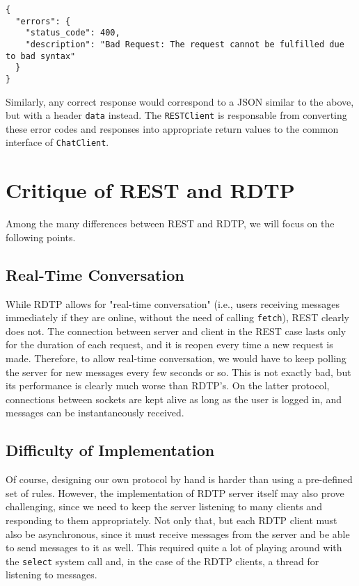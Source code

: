 \documentclass[10pt]{article}
\begin{document}
\medskip

\begin{verbatim}
{
  "errors": {
    "status_code": 400,
    "description": "Bad Request: The request cannot be fulfilled due to bad syntax"
  }
}
\end{verbatim}

\medskip

Similarly, any correct response would correspond to a JSON similar to the above,
but with a header \verb|data| instead. The \verb|RESTClient| is responsable from
converting these error codes and responses into appropriate return values to 
the common interface of \verb|ChatClient|.

\section{Critique of REST and RDTP}

Among the many differences between REST and RDTP, we will focus on the following points.

\subsection{Real-Time Conversation}

While RDTP allows for "real-time conversation" (i.e., users receiving messages immediately
if they are online, without the need of calling \verb|fetch|), REST clearly does not. The
connection between server and client in the REST case lasts only for the duration of each
request, and it is reopen every time a new request is made. Therefore, to allow real-time
conversation, we would have to keep polling the server for new messages every few seconds or so.
This is not exactly bad, but its performance is clearly much worse than RDTP's. On the latter
protocol, connections between sockets are kept alive as long as the user is logged in, and
messages can be instantaneously received.

\subsection{Difficulty of Implementation}

Of course, designing our own protocol by hand is harder than using a pre-defined set of
rules. However, the implementation of RDTP server itself may also prove challenging, since
we need to keep the server listening to many clients and responding to them appropriately.
Not only that, but each RDTP client must also be asynchronous, since it must receive messages
from the server and be able to send messages to it as well. This required quite a lot of
playing around with the \verb|select| system call and, in the case of the RDTP clients,
a thread for listening to messages. 
\end{document}
